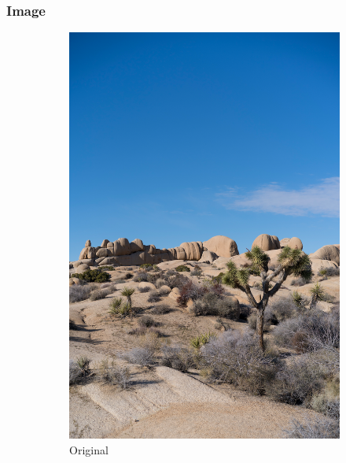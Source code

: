 \documentclass{article}
\begin{document}
\subsubsection{Image}


\begin{figure}
    \centering
    \begin{subfigure}[b]{0.32\textwidth}
        \centering
        \includegraphics[width=\textwidth]{../Resource/image.png}
        \caption{Original}
        \label{fig:image-hamming-bsc-original}
    \end{subfigure}
    \hfill
    \begin{subfigure}[b]{0.32\textwidth}
        \centering

\end{subfigure}
\end{figure}
\end{document}
